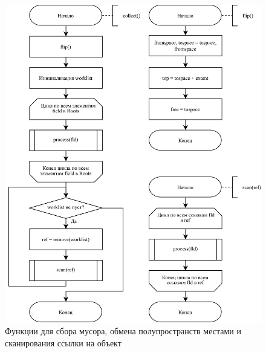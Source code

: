 \begin{figure}[H]
	\centering
	\includegraphics[scale=0.175]{assets/copying-2.png}
	\caption{Функции для сбора мусора, обмена полупространств местами и сканирования ссылки на объект}
	\label{fig:copying-2}
\end{figure}

